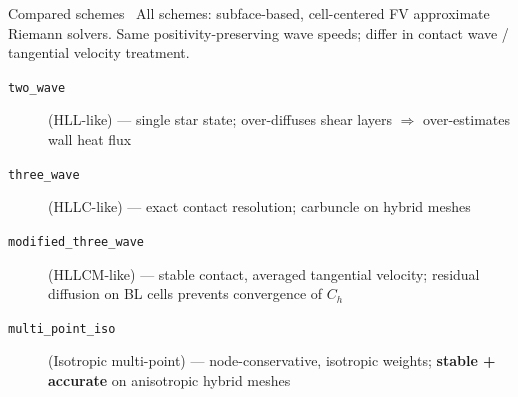 \documentclass[aspectratio=169, 10pt]{beamer}
\begin{document}
\begin{frame}{Compared schemes~\cite{Delmas2025, Delmas2026}}
  All schemes: subface-based, cell-centered FV approximate Riemann solvers.
  Same positivity-preserving wave speeds; differ in contact wave / tangential velocity treatment.
  \bigskip
  \begin{description}
    \item[\texttt{two\_wave}] (HLL-like) — single star state; over-diffuses shear layers
      $\Rightarrow$ over-estimates wall heat flux
    \item[\texttt{three\_wave}] (HLLC-like) — exact contact resolution; \alert{carbuncle} on hybrid meshes
    \item[\texttt{modified\_three\_wave}] (HLLCM-like) — stable contact, averaged tangential velocity;
      residual diffusion on BL cells prevents convergence of $C_h$
    \item[\texttt{multi\_point\_iso}] (Isotropic multi-point) — node-conservative, isotropic weights;
      \textbf{stable + accurate} on anisotropic hybrid meshes
  \end{description}
\end{frame}
\end{document}
